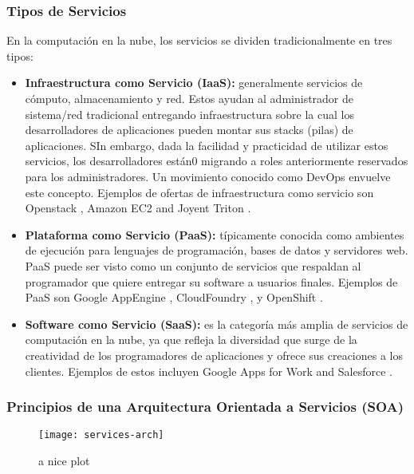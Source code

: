         \subsubsection{Tipos de Servicios}
        En la computación en la nube, los servicios se dividen tradicionalmente en tres tipos:
        \begin{itemize}
            \item \textbf{Infraestructura como Servicio (IaaS):} generalmente servicios de cómputo, almacenamiento y red. Estos ayudan al administrador de sistema/red tradicional entregando infraestructura sobre la cual los desarrolladores de aplicaciones pueden montar sus stacks (pilas) de aplicaciones. SIn embargo, dada la facilidad y practicidad de utilizar estos servicios, los desarrolladores están0 migrando a roles anteriormente reservados para los administradores. Un movimiento conocido como DevOps envuelve este concepto. Ejemplos de ofertas de infraestructura como servicio son Openstack \citeyear{Openstack2016-od}, Amazon EC2 \citeyear{Aws2016-fc} and Joyent Triton \citeyear{Joyent2016-wr}.
            \item \textbf{Plataforma como Servicio (PaaS): }típicamente conocida como ambientes de ejecución para lenguajes de programación, bases de datos y servidores web. PaaS puede ser visto como un conjunto de servicios que respaldan al programador que quiere entregar su software a usuarios finales. Ejemplos de PaaS son Google AppEngine \citeyear{Google2016-zb}, CloudFoundry \citeyear{Cloudfoundry2016-vz}, y OpenShift \citeyear{RedHat2016-sb}.
            \item \textbf{Software como Servicio (SaaS):} es la categoría más amplia de servicios de computación en la nube, ya que refleja la diversidad que surge de la creatividad de los programadores de aplicaciones y ofrece sus creaciones a los clientes. Ejemplos de estos incluyen Google Apps for Work\citeyear{Google2016-ts} and Salesforce \citeyear{Salesforce2016-mo}.
        \end{itemize}

        \subsubsection{Principios de una Arquitectura Orientada a Servicios (SOA)}
        
    \begin{figure}[H]
        \centering
        \texttt{[image: services-arch]}
        \caption{a nice plot \protect\cite{Fox2013-ct}}
        \label{fig:services-arch}
    \end{figure}
        
